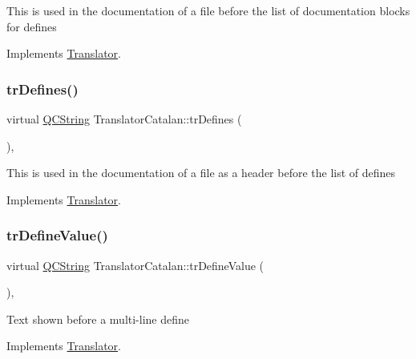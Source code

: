 This is used in the documentation of a file before the list of documentation blocks for defines 

Implements \mbox{\hyperlink{class_translator}{Translator}}.

\mbox{\label{class_translator_catalan_a732cc5c242b3016adacb1f5e34156fd1}} 
\subsubsection{\texorpdfstring{trDefines()}{trDefines()}}
{\footnotesize\ttfamily virtual \mbox{\hyperlink{class_q_c_string}{Q\+C\+String}} Translator\+Catalan\+::tr\+Defines (\begin{DoxyParamCaption}{ }\end{DoxyParamCaption})\hspace{0.3cm}{\ttfamily [inline]}, {\ttfamily [virtual]}}

This is used in the documentation of a file as a header before the list of defines 

Implements \mbox{\hyperlink{class_translator}{Translator}}.

\mbox{\label{class_translator_catalan_ab816c0df0a6f2fa0869a00626023ecac}} 
\subsubsection{\texorpdfstring{trDefineValue()}{trDefineValue()}}
{\footnotesize\ttfamily virtual \mbox{\hyperlink{class_q_c_string}{Q\+C\+String}} Translator\+Catalan\+::tr\+Define\+Value (\begin{DoxyParamCaption}{ }\end{DoxyParamCaption})\hspace{0.3cm}{\ttfamily [inline]}, {\ttfamily [virtual]}}

Text shown before a multi-\/line define 

Implements \mbox{\hyperlink{class_translator}{Translator}}.

\mbox{\label{class_translator_catalan_af97adec80a57c072309c04ea3efcd176}} 
